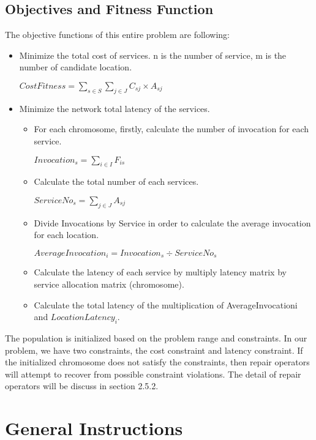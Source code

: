 \documentclass[twoside]{article}
\begin{document}
\subsection{Objectives and Fitness Function}
The objective functions of this entire problem are following:
\begin{itemize}
	\item Minimize the total cost of services. n is the number of service, m is the number of candidate location.
		\begin{center}
			$CostFitness = \sum\limits_{s \in S} \sum\limits_{j \in J} C_{sj} \times A_{sj}$
		\end{center}
	\item Minimize the network total latency of the services.
		\begin{itemize}
			\item For each chromosome, firstly, calculate the number of invocation for each service.
				\begin{center}
					$Invocation_{s} = \sum\limits_{i \in I} F_{is}$
				\end{center}
			\item Calculate the total number of each services.
				\begin{center}
					$ServiceNo_{s} = \sum\limits_{j \in J} A_{sj}$
				\end{center}
			\item Divide Invocations by Service in order to calculate the average invocation for each location.
				\begin{center}
					$AverageInvocation_{i} = Invocation_{s} \div ServiceNo_{s}$
				\end{center}

			\item Calculate the latency of each service by multiply latency matrix by service allocation matrix (chromosome).
			\item Calculate the total latency of the multiplication of AverageInvocationi and $LocationLatency_{i}$.
		\end{itemize}
\end{itemize}
The population is initialized based on the problem range and constraints. 
In our problem, we have two constraints, the cost constraint and latency constraint. 
If the initialized chromosome does not satisfy the constraints, then repair operators will attempt to 
recover from possible constraint violations. The detail of repair operators will be discuss in section 2.5.2.
\section{General Instructions}
\end{document}
